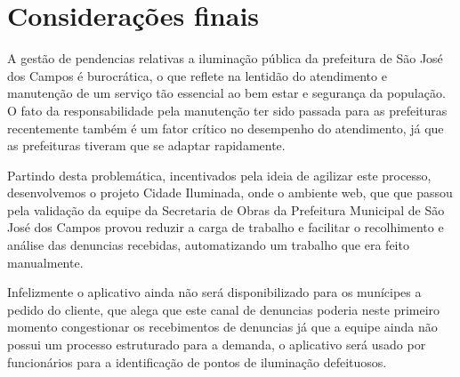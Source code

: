 \documentclass[
	article,			%
	11pt,				%
	oneside,			%
	a4paper,			%
	english,			%
	brazil,				%
	sumario=tradicional
	]{abntex2}
\begin{document}




%

\section*{Considerações finais}

A gestão de pendencias relativas a iluminação pública da prefeitura de São José
dos Campos é burocrática, o que reflete na lentidão do atendimento e manutenção
de um serviço tão essencial ao bem estar e segurança da população. O fato da
responsabilidade pela manutenção ter sido passada para as prefeituras recentemente
também é um fator crítico no desempenho do atendimento, já que as prefeituras
tiveram que se adaptar rapidamente.

Partindo desta problemática, incentivados pela ideia de agilizar este processo,
desenvolvemos o projeto Cidade Iluminada, onde o ambiente web, que que passou
pela validação da equipe da Secretaria de Obras da Prefeitura Municipal de São
José dos Campos provou reduzir a carga de trabalho e facilitar o recolhimento e
análise das denuncias recebidas, automatizando um trabalho que era feito manualmente.

Infelizmente o aplicativo ainda não será disponibilizado para os munícipes a
pedido do cliente, que alega que este canal de denuncias poderia  neste primeiro
momento congestionar os recebimentos de denuncias já que a equipe ainda não
possui um processo estruturado para a demanda, o aplicativo será usado por
funcionários para a identificação de pontos de iluminação defeituosos.
\end{document}
